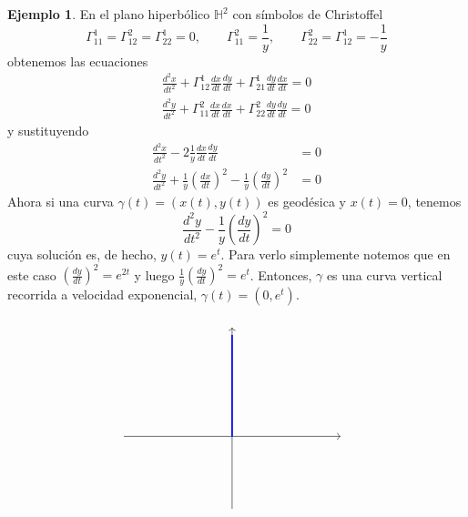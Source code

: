 \documentclass[spanish]{book}
\theoremstyle{definition}
\newtheorem*{ejem}{Ejemplo}
\newcommand{\Hy}{\mathbb{H}}
\begin{document}
	\begin{ejem}
		En el plano hiperbólico $\Hy^2$ con símbolos de Christoffel
		\[\Gamma^1_{11}=\Gamma^2_{12}=\Gamma^1_{22}=0,\qquad \Gamma_{11}^2=\frac{1}{y},\qquad \Gamma_{22}^2=\Gamma^1_{12}=-\frac{1}{y}\]
		obtenemos las ecuaciones
		\begin{align*}
			\frac{d^2x}{dt^2}+\Gamma_{12}^1\frac{dx}{dt}\frac{dy}{dt}+\Gamma^1_{21}\frac{dy}{dt}\frac{dx}{dt}=0\\
			\frac{d^2y}{dt^2}+\Gamma_{11}^2\frac{dx}{dt}\frac{dx}{dt}+\Gamma^2_{22}\frac{dy}{dt}\frac{dy}{dt}=0
		\end{align*}
		y sustituyendo
		\begin{align*}
			\frac{d^2x}{dt^2}-2\frac{1}{y}\frac{dx}{dt}\frac{dy}{dt}&=0\\
			\frac{d^2y}{dt^2}+\frac{1}{y}\left(\frac{dx}{dt}\right)^2-\frac{1}{y}\left(\frac{dy}{dt}\right)^2&=0
		\end{align*}
		Ahora si una curva $\gamma(t)=(x(t),y(t))$ es geodésica y $x(t)=0$, tenemos 
		\[\frac{d^2y}{dt^2}-\frac{1}{y}\left(\frac{dy}{dt}\right)^2=0\]
		cuya solución es, de hecho, $y(t)=e^t$. Para verlo simplemente notemos que en este caso $\left(\frac{dy}{dt}\right)^2=e^{2t}$ y luego $\frac{1}{y}\left(\frac{dy}{dt}\right)^2=e^t$. Entonces, $\gamma$ es una curva vertical recorrida a velocidad exponencial, $\gamma(t)=(0,e^t)$.
		
			\[\begin{tikzpicture}
			\draw[->] (-3,0) -- (3,0) node[right] {};
			\draw[->] (0,-2) -- (0,3) node[above] {};
			
			\draw[blue, very thick, domain=0:2.8] plot (0,\x);
		\end{tikzpicture}\]
	\end{ejem}
	
\end{document}
